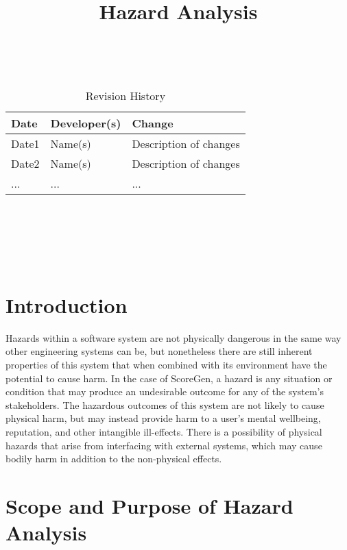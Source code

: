 \documentclass{article}
\title{Hazard Analysis\\\progname}
\author{\authname}
\date{}
\begin{document}
\maketitle
\thispagestyle{empty}

~\newpage


\begin{table}[hp]
\caption{Revision History} \label{TblRevisionHistory}
\begin{tabularx}{\textwidth}{llX}
\toprule
\textbf{Date} & \textbf{Developer(s)} & \textbf{Change}\\
\midrule
Date1 & Name(s) & Description of changes\\
Date2 & Name(s) & Description of changes\\
... & ... & ...\\
\bottomrule
\end{tabularx}
\end{table}

~\newpage

\tableofcontents

~\newpage

\listoftables

~\newpage



\section{Introduction}

Hazards within a software system are not physically dangerous in the same way other engineering systems can be, 
but nonetheless there are still inherent properties of this system that when combined with its environment have 
the potential to cause harm. In the case of ScoreGen, a hazard is any situation or condition that may produce an 
undesirable outcome for any of the system’s stakeholders. The hazardous outcomes of this system are not likely to 
cause physical harm, but may instead provide harm to a user’s mental wellbeing, reputation, and other intangible 
ill-effects. There is a possibility of physical hazards that arise from interfacing with external systems, which 
may cause bodily harm in addition to the non-physical effects.

\section{Scope and Purpose of Hazard Analysis}
\end{document}
